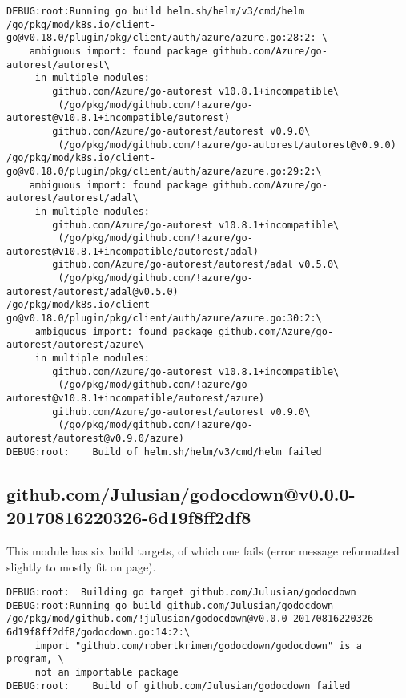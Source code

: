 \documentclass[a4paper]{paper}
\begin{document}
\begin{verbatim}
DEBUG:root:Running go build helm.sh/helm/v3/cmd/helm
/go/pkg/mod/k8s.io/client-go@v0.18.0/plugin/pkg/client/auth/azure/azure.go:28:2: \
    ambiguous import: found package github.com/Azure/go-autorest/autorest\
     in multiple modules:
        github.com/Azure/go-autorest v10.8.1+incompatible\
         (/go/pkg/mod/github.com/!azure/go-autorest@v10.8.1+incompatible/autorest)
        github.com/Azure/go-autorest/autorest v0.9.0\
         (/go/pkg/mod/github.com/!azure/go-autorest/autorest@v0.9.0)
/go/pkg/mod/k8s.io/client-go@v0.18.0/plugin/pkg/client/auth/azure/azure.go:29:2:\
    ambiguous import: found package github.com/Azure/go-autorest/autorest/adal\
     in multiple modules:
        github.com/Azure/go-autorest v10.8.1+incompatible\
         (/go/pkg/mod/github.com/!azure/go-autorest@v10.8.1+incompatible/autorest/adal)
        github.com/Azure/go-autorest/autorest/adal v0.5.0\
         (/go/pkg/mod/github.com/!azure/go-autorest/autorest/adal@v0.5.0)
/go/pkg/mod/k8s.io/client-go@v0.18.0/plugin/pkg/client/auth/azure/azure.go:30:2:\
     ambiguous import: found package github.com/Azure/go-autorest/autorest/azure\
     in multiple modules:
        github.com/Azure/go-autorest v10.8.1+incompatible\
         (/go/pkg/mod/github.com/!azure/go-autorest@v10.8.1+incompatible/autorest/azure)
        github.com/Azure/go-autorest/autorest v0.9.0\
         (/go/pkg/mod/github.com/!azure/go-autorest/autorest@v0.9.0/azure)
DEBUG:root:    Build of helm.sh/helm/v3/cmd/helm failed
\end{verbatim}

\subsection{github.com/Julusian/godocdown@v0.0.0-20170816220326-6d19f8ff2df8}

This module has six build targets, of which one fails (error message reformatted slightly to mostly fit on page).

\begin{verbatim}
DEBUG:root:  Building go target github.com/Julusian/godocdown
DEBUG:root:Running go build github.com/Julusian/godocdown
/go/pkg/mod/github.com/!julusian/godocdown@v0.0.0-20170816220326-6d19f8ff2df8/godocdown.go:14:2:\
     import "github.com/robertkrimen/godocdown/godocdown" is a program, \
     not an importable package
DEBUG:root:    Build of github.com/Julusian/godocdown failed
\end{verbatim}
\end{document}
